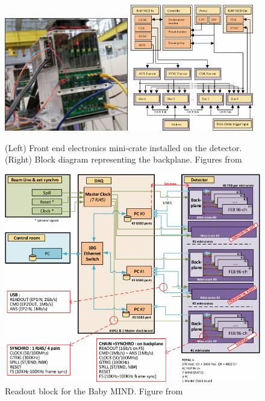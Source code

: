 \begin{figure}[h!]
\centering
\includegraphics[width=0.48\textwidth]{figures/crateInstalled.png}
\includegraphics[width=0.48\textwidth]{figures/backplane.png}
\caption{(Left) Front end electronics mini-crate installed on the detector. (Right) Block diagram representing the backplane. Figures from \cite{52Georgi}}
\label{fig:crate}
\end{figure}

\begin{figure}[h!]
\centering
\includegraphics[width=\textwidth]{figures/fullDAQ.png}
\caption{Readout block for the Baby MIND. Figure from \cite{52Georgi}}
\label{fig:daqChain}
\end{figure}



